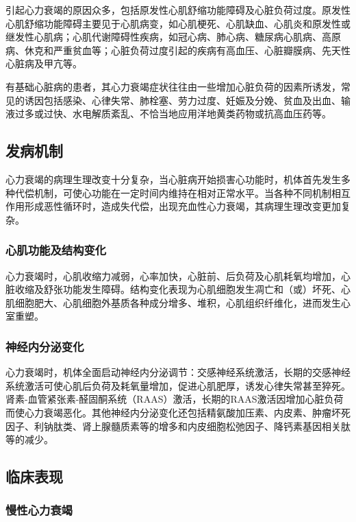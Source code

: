 引起心力衰竭的原因众多，包括原发性心肌舒缩功能障碍及心脏负荷过度。原发性心肌舒缩功能障碍主要见于心肌病变，如心肌梗死、心肌缺血、心肌炎和原发性或继发性心肌病；心肌代谢障碍性疾病，如冠心病、肺心病、糖尿病心肌病、高原病、休克和严重贫血等；心脏负荷过度引起的疾病有高血压、心脏瓣膜病、先天性心脏病及甲亢等。

有基础心脏病的患者，其心力衰竭症状往往由一些增加心脏负荷的因素所诱发，常见的诱因包括感染、心律失常、肺栓塞、劳力过度、妊娠及分娩、贫血及出血、输液过多或过快、水电解质紊乱、不恰当地应用洋地黄类药物或抗高血压药等。

\subsection{发病机制}

心力衰竭的病理生理改变十分复杂，当心脏病开始损害心功能时，机体首先发生多种代偿机制，可使心功能在一定时间内维持在相对正常水平。当各种不同机制相互作用形成恶性循环时，造成失代偿，出现充血性心力衰竭，其病理生理改变更加复杂。

\subsubsection{心肌功能及结构变化}

心力衰竭时，心肌收缩力减弱，心率加快，心脏前、后负荷及心肌耗氧均增加，心脏收缩及舒张功能发生障碍。结构变化表现为心肌细胞发生凋亡和（或）坏死、心肌细胞肥大、心肌细胞外基质各种成分增多、堆积，心肌组织纤维化，进而发生心室重塑。

\subsubsection{神经内分泌变化}

心力衰竭时，机体全面启动神经内分泌调节：交感神经系统激活，长期的交感神经系统激活可使心肌后负荷及耗氧量增加，促进心肌肥厚，诱发心律失常甚至猝死。肾素-血管紧张素-醛固酮系统（RAAS）激活，长期的RAAS激活因增加心脏负荷而使心力衰竭恶化。其他神经内分泌变化还包括精氨酸加压素、内皮素、肿瘤坏死因子、利钠肽类、肾上腺髓质素等的增多和内皮细胞松弛因子、降钙素基因相关肽等的减少。

\subsection{临床表现}

\subsubsection{慢性心力衰竭}

